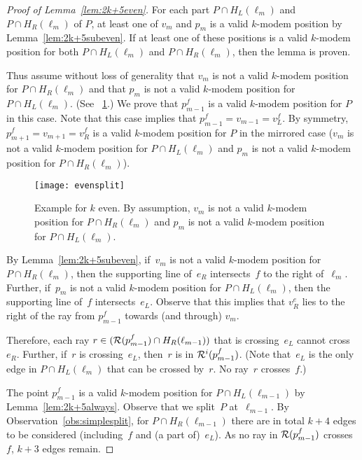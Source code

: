 \documentclass[A4]{article}
\begin{document}
\begin{proof}[Proof of Lemma~\ref{lem:2k+5even}]
For each part $P\cap H_L(\ell_{m})$ and $P\cap H_R(\ell_{m})$ of $P$, at least one of $v_m$ and $p_m$ is a valid \mbox{$k$-modem} position by Lemma~\ref{lem:2k+5subeven}.
If at least one of these positions is a valid \mbox{$k$-modem} position for both $P\cap H_L(\ell_{m})$ and $P\cap H_R(\ell_{m})$, then the lemma is proven.

Thus assume without loss of generality that $v_m$ is not a valid \mbox{$k$-modem} position for $P\cap H_R(\ell_{m})$ and that $p_m$ is not a valid \mbox{$k$-modem} position for $P\cap H_L(\ell_{m})$.
(See \figurename~\ref{fig:evensplit}.) 
We prove that $p^f_{m-1}$ is a valid \mbox{$k$-modem} position for $P$ in this case.
Note that this case implies that $p^f_{m-1}=v_{m-1}=v^f_L$.
By symmetry, $p^f_{m+1}=v_{m+1}=v^f_R$ is a valid \mbox{$k$-modem} position for $P$ in the mirrored case ($v_m$ is not a valid \mbox{$k$-modem} position for $P\cap H_L(\ell_{m})$ and $p_m$ is not a valid \mbox{$k$-modem} position for $P\cap H_R(\ell_{m})$).

\begin{figure}[htb]
  \centering
  \texttt{[image: evensplit]}
  \caption{Example for $k$ even. By assumption, $v_m$ is not a valid \mbox{$k$-modem} position for $P\cap H_R(\ell_{m})$ and $p_m$ is not a valid \mbox{$k$-modem} position for $P\cap H_L(\ell_{m})$.}
  \label{fig:evensplit}
\end{figure}

By Lemma~\ref{lem:2k+5subeven}, if~$v_m$ is not a valid \mbox{$k$-modem} position for $P\cap H_R(\ell_{m})$, then the supporting line of~$e_R$ intersects~$f$ to the right of~$\ell_m$.
Further, if~$p_m$ is not a valid \mbox{$k$-modem} position for $P\cap H_L(\ell_{m})$, then the supporting line of~$f$ intersects~$e_L$.
Observe that this implies that $v^e_R$ lies to the right of the ray from $p^f_{m-1}$ towards (and through) $v_m$.


Therefore, each ray $r\in( {\cal R}(p^f_{m-1})\cap H_R(\ell_{m-1}) )$ that is crossing~$e_L$ cannot cross~$e_R$.
Further, if~$r$ is crossing~$e_L$, then~$r$ is in ${\cal R}^i(p^f_{m-1})$.
(Note that~$e_L$ is the only edge in $P\cap H_L(\ell_{m})$ that can be crossed by~$r$.
No ray~$r$ crosses~$f$.)


The point $p^f_{m-1}$ is a valid \mbox{$k$-modem} position for $P\cap H_L(\ell_{m-1})$ by Lemma~\ref{lem:2k+5always}.
Observe that we split~$P$ at~$\ell_{m-1}$.
By Observation~\ref{obs:simplesplit}, for $P\cap H_R(\ell_{m-1})$ there are in total $k+4$ edges to be considered (including~$f$ and (a part of)~$e_L$).
As no ray in ${\cal R}(p^f_{m-1})$ crosses~$f$, $k+3$ edges remain.


\end{proof}
\end{document}
